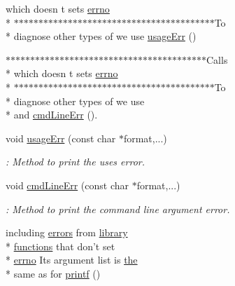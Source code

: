 \begin{DoxyCompactItemize}
which doesn t sets \hyperlink{common_2README_afe75ee0c7e5a90ba6bb38426ea69b996}{errno} \\*
$\ast$$\ast$$\ast$$\ast$$\ast$$\ast$$\ast$$\ast$$\ast$$\ast$$\ast$$\ast$$\ast$$\ast$$\ast$$\ast$$\ast$$\ast$$\ast$$\ast$$\ast$$\ast$$\ast$$\ast$$\ast$$\ast$$\ast$$\ast$$\ast$$\ast$$\ast$$\ast$$\ast$$\ast$$\ast$$\ast$$\ast$$\ast$$\ast$$\ast$$\ast$To \\*
diagnose other types of we use \hyperlink{common_2README_aff916c132f7e6f0b0dec6d7c28ee2573}{usage\-Err} ()
\item 
$\ast$$\ast$$\ast$$\ast$$\ast$$\ast$$\ast$$\ast$$\ast$$\ast$$\ast$$\ast$$\ast$$\ast$$\ast$$\ast$$\ast$$\ast$$\ast$$\ast$$\ast$$\ast$$\ast$$\ast$$\ast$$\ast$$\ast$$\ast$$\ast$$\ast$$\ast$$\ast$$\ast$$\ast$$\ast$$\ast$$\ast$$\ast$$\ast$$\ast$$\ast$Calls \\*
which doesn t sets \hyperlink{common_2README_afe75ee0c7e5a90ba6bb38426ea69b996}{errno} \\*
$\ast$$\ast$$\ast$$\ast$$\ast$$\ast$$\ast$$\ast$$\ast$$\ast$$\ast$$\ast$$\ast$$\ast$$\ast$$\ast$$\ast$$\ast$$\ast$$\ast$$\ast$$\ast$$\ast$$\ast$$\ast$$\ast$$\ast$$\ast$$\ast$$\ast$$\ast$$\ast$$\ast$$\ast$$\ast$$\ast$$\ast$$\ast$$\ast$$\ast$$\ast$To \\*
diagnose other types of we use \\*
and \hyperlink{common_2README_a63ccbdd536fd5a8c256b6aba4bab691a}{cmd\-Line\-Err} ().
\item 
void \hyperlink{common_2README_a0c81140d074e6630634e05e7ca437390}{usage\-Err} (const char $\ast$format,...)
\begin{DoxyCompactList}\small\item\em \-: Method to print the uses error. \end{DoxyCompactList}\item 
void \hyperlink{common_2README_a2998a663efe6e91b3870e2bb7fba5504}{cmd\-Line\-Err} (const char $\ast$format,...)
\begin{DoxyCompactList}\small\item\em \-: Method to print the command line argument error. \end{DoxyCompactList}\item 
including \hyperlink{common_2README_a9912daeb8cc621a6ee8e1d24ebdbe601}{errors} from \hyperlink{ClientServer_2server_2Makefile_a1f477410360bd4832116581b9934ab71}{library} \\*
\hyperlink{common_2README_a853571ba73c010b99ff2788a0cfe4395}{functions} that don’t set \\*
\hyperlink{common_2README_afe75ee0c7e5a90ba6bb38426ea69b996}{errno} Its argument list is \hyperlink{ClientServer_2server_2Makefile_a09c6b60bb7451f9136e25140ffdff6bd}{the} \\*
same as for \hyperlink{common_2README_ae46f6c5c5729768631dc5ff84e16d52b}{printf} ()
\end{DoxyCompactItemize}
